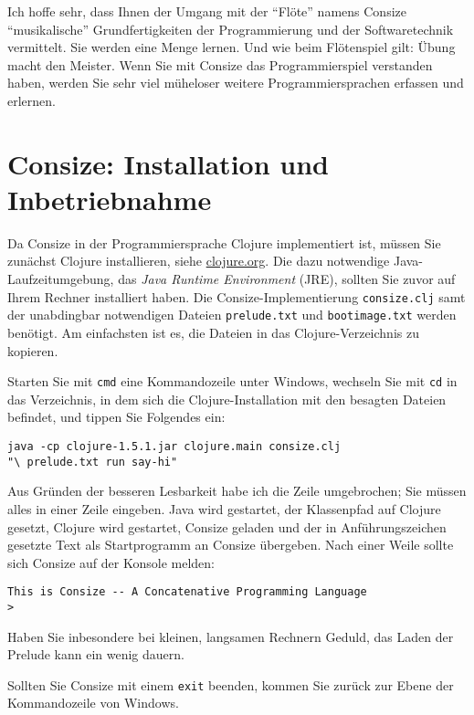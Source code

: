 Ich hoffe sehr, dass Ihnen der Umgang mit der "`Flöte"' namens Consize "`musikalische"' Grundfertigkeiten der Programmierung und der Softwaretechnik vermittelt. Sie werden eine Menge lernen. Und wie beim Flötenspiel gilt: Übung macht den Meister. Wenn Sie mit Consize das Programmierspiel verstanden haben, werden Sie sehr viel müheloser weitere Programmiersprachen erfassen und erlernen.

\section{Consize: Installation und Inbetriebnahme}

Da Consize in der Programmiersprache Clojure implementiert ist, müssen Sie zunächst Clojure installieren, siehe \href{http://clojure.org/}{clojure.org}. Die dazu notwendige Java-Laufzeitumgebung, das \emph{Java Runtime Environment} (JRE), sollten Sie zuvor auf Ihrem Rechner installiert haben. Die Consize-Im\-ple\-men\-tie\-rung \verb|consize.clj| samt der unabdingbar notwendigen Dateien \verb|prelude.txt| und \verb|bootimage.txt| werden benötigt.
Am einfachsten ist es, die Dateien in das Clojure-Verzeichnis zu kopieren.

Starten Sie mit \verb|cmd| eine Kommandozeile unter Windows, wechseln Sie mit \verb|cd| in das Verzeichnis, in dem sich die Clojure-Installation mit den besagten Dateien befindet, und tippen Sie Folgendes ein:

\begin{verbatim}
java -cp clojure-1.5.1.jar clojure.main consize.clj
"\ prelude.txt run say-hi"
\end{verbatim}

Aus Gründen der besseren Lesbarkeit habe ich die Zeile umgebrochen; Sie müssen alles in einer Zeile eingeben. Java wird gestartet, der Klassenpfad auf Clojure gesetzt, Clojure wird gestartet, Consize geladen und der in Anführungszeichen gesetzte Text als Startprogramm an Consize übergeben. Nach einer Weile sollte sich Consize auf der Konsole melden:

\begin{verbatim}
This is Consize -- A Concatenative Programming Language
> 
\end{verbatim}

Haben Sie inbesondere bei kleinen, langsamen Rechnern Geduld, das Laden der Prelude kann ein wenig dauern.

Sollten Sie Consize mit einem \verb|exit| beenden, kommen Sie zurück zur Ebene der Kommandozeile von Windows.


